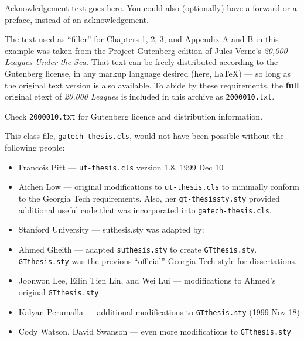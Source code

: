 Acknowledgement text goes here.  You could also (optionally)
have a forward or a preface, instead of an acknowledgement.

The text used as ``filler'' for Chapters 1, 2, 3, and 
Appendix A and B in this example was taken from the Project
Gutenberg edition of Jules Verne's \textit{20,000 Leagues Under the Sea.}
That text can be freely distributed according to the Gutenberg
license, in any markup language desired (here, \LaTeX) --- so long
as the original text version is also available.  To abide by
these requirements, the \textbf{full} original etext of
\textit{20,000 Leagues} is included in this archive as \texttt{2000010.txt}.

Check \texttt{2000010.txt} for Gutenberg licence and distribution
information.

This class file, \texttt{gatech-thesis.cls}, would not have been
possible without the following people:
\begin{itemize}
\itemsep 0in
\parsep 0in
\item Francois Pitt --- \texttt{ut-thesis.cls} version 1.8, 1999 Dec 10
\item Aichen Low --- original modifications to \texttt{ut-thesis.cls} to 
minimally conform to the Georgia Tech requirements.  Also, her
\texttt{gt-thesissty.sty} provided additional useful 
code that was incorporated into \texttt{gatech-thesis.cls}.
\item Stanford University --- suthesis.sty was adapted by:
\item Ahmed Gheith --- adapted \texttt{suthesis.sty} to create 
\texttt{GTthesis.sty}.  \texttt{GTthesis.sty} was the previous ``official''
Georgia Tech style for dissertations.
\item Joonwon Lee, Eilin Tien Lin, and Wei Lui --- modifications to Ahmed's
original \texttt{GTthesis.sty}
\item Kalyan Perumalla --- additional modifications to \texttt{GTthesis.sty}
(1999 Nov 18)
\item Cody Watson, David Swanson --- even more modifications to 
\texttt{GTthesis.sty}
\end{itemize}